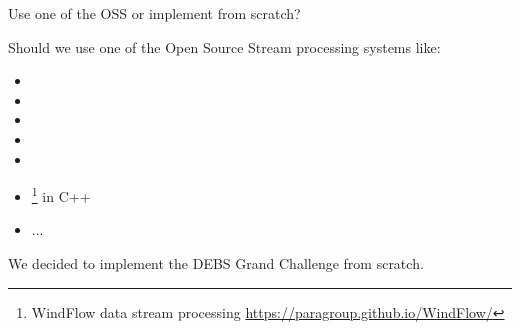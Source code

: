 \documentclass[9pt]{beamer}
\begin{document}

\begin{frame}[fragile]{ Use one of the OSS or implement from scratch?}


    Should we use one of the Open Source Stream processing systems like: 
\begin{itemize}
    \item {}
    \item {}
    \item {}
    \item {} 
    \item {}
    \item {}\footnote{WindFlow data stream processing \url{https://paragroup.github.io/WindFlow/}} in C++ 
    \item  ... 
\end{itemize}

    We decided to implement the DEBS Grand Challenge from scratch. 
    
        
\end{frame}


\end{document}
